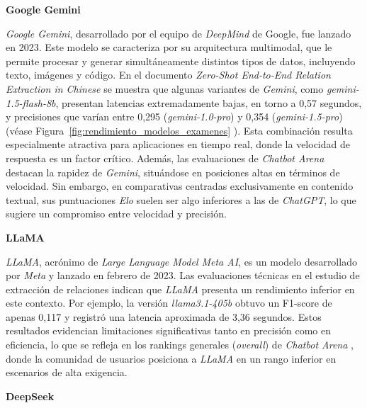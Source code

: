 \vspace{0.4cm}
\noindent\textbf{Google Gemini}

\textit{Google Gemini}, desarrollado por el equipo de \textit{DeepMind} de Google, fue lanzado en 2023. Este modelo se caracteriza por su arquitectura multimodal, que le permite procesar y generar simultáneamente distintos tipos de datos, incluyendo texto, imágenes y código. En el documento \textit{Zero-Shot End-to-End Relation Extraction in Chinese} \cite{ref41} se muestra que algunas variantes de \textit{Gemini}, como \textit{gemini-1.5-flash-8b}, presentan latencias extremadamente bajas, en torno a 0,57 segundos, y precisiones que varían entre 0,295 (\textit{gemini-1.0-pro}) y 0,354 (\textit{gemini-1.5-pro}) (véase Figura~\ref{fig:rendimiento_modelos_examenes} \cite{ref41} ). Esta combinación resulta especialmente atractiva para aplicaciones en tiempo real, donde la velocidad de respuesta es un factor crítico.
Además, las evaluaciones de \textit{Chatbot Arena} destacan la rapidez de \textit{Gemini}, situándose en posiciones altas en términos de velocidad. Sin embargo, en comparativas centradas exclusivamente en contenido textual, sus puntuaciones \textit{Elo} suelen ser algo inferiores a las de \textit{ChatGPT}, lo que sugiere un compromiso entre velocidad y precisión.

\vspace{0.4cm}
\noindent\textbf{LLaMA}

\textit{LLaMA}, acrónimo de \textit{Large Language Model Meta AI}, es un modelo desarrollado por \textit{Meta} y lanzado en febrero de 2023. Las evaluaciones técnicas en el estudio de extracción de relaciones indican que \textit{LLaMA} presenta un rendimiento inferior en este contexto. Por ejemplo, la versión \textit{llama3.1-405b} obtuvo un F1-score de apenas 0,117 y registró una latencia aproximada de 3,36 segundos. Estos resultados evidencian limitaciones significativas tanto en precisión como en eficiencia, lo que se refleja en los rankings generales (\textit{overall}) de \textit{Chatbot Arena} \cite{ref44}, donde la comunidad de usuarios posiciona a \textit{LLaMA} en un rango inferior en escenarios de alta exigencia.

\newpage
\noindent\textbf{DeepSeek}

